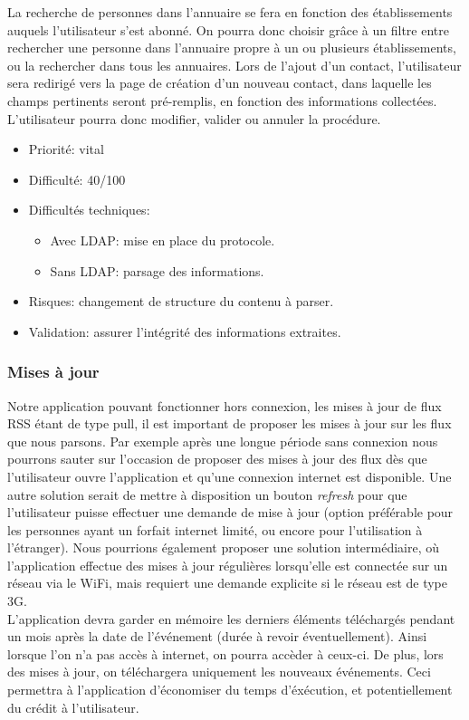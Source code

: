 \documentclass [pdftex,12pt] {report}
\def\wl{\par \vspace{\baselineskip}}
\begin{document}
\wl La recherche de personnes dans l'annuaire se fera en fonction des établissements auquels l'utilisateur s'est abonné. On pourra donc choisir grâce à un filtre entre rechercher une personne dans l'annuaire propre à un ou plusieurs établissements, ou la rechercher dans tous les annuaires.
Lors de l'ajout d'un contact, l'utilisateur sera redirigé vers la page de création d'un nouveau contact, dans laquelle les champs pertinents seront pré-remplis, en fonction des informations collectées. L'utilisateur pourra donc modifier, valider ou annuler la procédure. \\

\begin{itemize}
\renewcommand{\labelitemi}{$\bullet$}
\item Priorité: vital
\item Difficulté: 40/100
\item Difficultés techniques:
\begin{itemize}
\item Avec LDAP: mise en place du protocole.
\item Sans LDAP: parsage des informations.
\end{itemize} 
\item Risques: changement de structure du contenu à parser.
\item Validation: assurer l'intégrité des informations extraites.
\end{itemize}

\subsubsection{Mises à jour}
Notre application pouvant fonctionner hors connexion, les mises à jour de flux RSS étant de type pull, il est important de proposer les mises à jour sur les flux que nous parsons. Par exemple après une longue période sans connexion nous pourrons sauter sur l'occasion de proposer des mises à jour des flux dès que l'utilisateur ouvre l'application et qu'une connexion internet est disponible. Une autre solution serait de mettre à disposition un bouton \emph{refresh} pour que l'utilisateur puisse effectuer une demande de mise à jour (option préférable pour les personnes ayant un forfait internet limité, ou encore pour l'utilisation à l'étranger). Nous pourrions également proposer une solution intermédiaire, où l'application effectue des mises à jour régulières lorsqu'elle est connectée sur un réseau via le WiFi, mais requiert une demande explicite si le réseau est de type 3G. \\
L'application devra garder en mémoire les derniers éléments téléchargés pendant un mois après la date de l'événement (durée à revoir éventuellement). Ainsi lorsque l'on n'a pas accès à internet, on pourra accèder à ceux-ci. De plus, lors des mises à jour, on téléchargera uniquement les nouveaux événements. Ceci permettra à l'application d'économiser du temps d'éxécution, et potentiellement du crédit à l'utilisateur. \\
\end{document}
